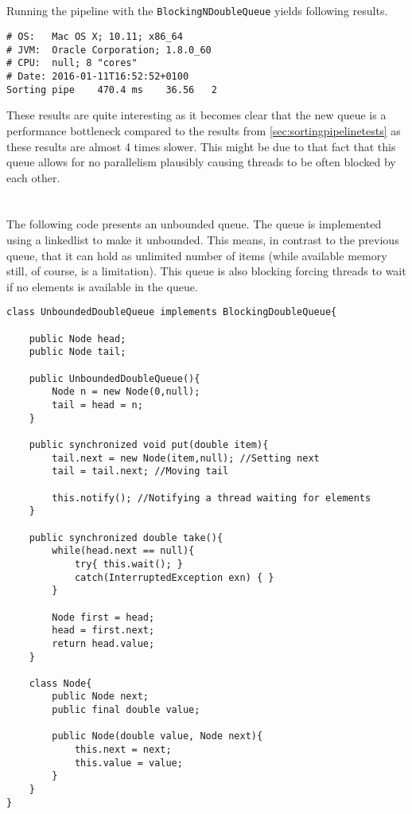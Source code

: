 \documentclass{ituhandin}
\begin{document}
\section{}
Running the pipeline with the \texttt{BlockingNDoubleQueue} yields following results.
\begin{lstlisting}[language={},frame={}]
# OS:   Mac OS X; 10.11; x86_64
# JVM:  Oracle Corporation; 1.8.0_60
# CPU:  null; 8 "cores"
# Date: 2016-01-11T16:52:52+0100
Sorting pipe    470.4 ms    36.56   2
\end{lstlisting}
These results are quite interesting as it becomes clear that the new queue is a performance bottleneck compared to the results from \ref{sec:sortingpipelinetests} as these results are almost 4 times slower. This might be due to that fact that this queue allows for no parallelism plausibly causing threads to be often blocked by each other.

\chapter{} %
\section{}
The following code presents an unbounded queue. The queue is implemented using a linkedlist to make it unbounded.  This means, in contrast to the previous queue, that it can hold as unlimited number of items (while available memory still, of course, is a limitation). This queue is also blocking forcing threads to wait if no elements is available in the queue.
\begin{lstlisting}[caption= Implementation of the \texttt{UnboundedDoubleQueue} blocking queue]
class UnboundedDoubleQueue implements BlockingDoubleQueue{

    public Node head;
    public Node tail;

    public UnboundedDoubleQueue(){
        Node n = new Node(0,null);
        tail = head = n;
    }

    public synchronized void put(double item){
        tail.next = new Node(item,null); //Setting next
        tail = tail.next; //Moving tail

        this.notify(); //Notifying a thread waiting for elements
    }

    public synchronized double take(){
        while(head.next == null){
            try{ this.wait(); }
            catch(InterruptedException exn) { }
        }

        Node first = head;
        head = first.next;
        return head.value;
    }

    class Node{
        public Node next;
        public final double value;

        public Node(double value, Node next){
            this.next = next;
            this.value = value;
        }
    }
}
\end{lstlisting}
\end{document}
